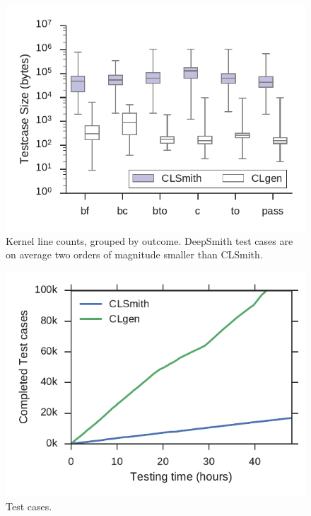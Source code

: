 \begin{figure}
	\centering %
	\includegraphics[width=\columnwidth]{build/img/kernel-sizes}%
	\caption{%
		Kernel line counts, grouped by outcome. DeepSmith test cases are on average two orders of magnitude smaller than CLSmith.%
	}%
	\label{fig:kernel-sizes} %
\end{figure}


\begin{figure}
	\centering %
	\includegraphics[width=\columnwidth]{build/img/total-tests}%
	\caption{%
		Test cases. %
	}%
	\label{fig:total-tests} %
\end{figure}